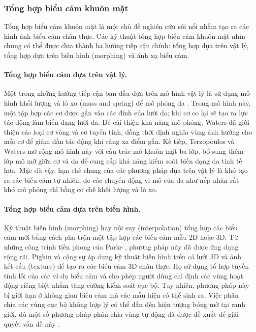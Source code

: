 \subsubsection{Tổng hợp biểu cảm khuôn mặt}

Tổng hợp biểu cảm khuôn mặt là một chủ đề nghiên cứu sôi nổi nhằm tạo ra các hình ảnh biểu cảm chân thực. Các kỹ thuật tổng hợp biểu cảm khuôn mặt nhìn chung có thể được chia thành ba hướng tiếp cận chính: tổng hợp dựa trên vật lý, tổng hợp dựa trên biến hình (morphing) và ánh xạ biểu cảm.

\paragraph{Tổng hợp biểu cảm dựa trên vật lý.}
Một trong những hướng tiếp cận ban đầu dựa trên mô hình vật lý là sử dụng mô hình khối lượng và lò xo (mass and spring) để mô phỏng da \cite{badler19813d}. Trong mô hình này, một tập hợp các cơ được gắn vào các đỉnh của lưới da; khi cơ co lại sẽ tạo ra lực tác động làm biến dạng lưới da. Để cải thiện khả năng mô phỏng, Waters \cite{waters1987muscle} đã giới thiệu các loại cơ vòng và cơ tuyến tính, đồng thời định nghĩa vùng ảnh hưởng cho mỗi cơ để giảm dần tác động khi càng xa điểm gắn. Kế tiếp, Terzopoulos và Waters \cite{terzopoulos1990physically} mở rộng mô hình này với cấu trúc mô khuôn mặt ba lớp, bổ sung thêm lớp mô mỡ giữa cơ và da để cung cấp khả năng kiểm soát biến dạng da tinh tế hơn. Mặc dù vậy, hạn chế chung của các phương pháp dựa trên vật lý là khó tạo ra các biểu cảm tự nhiên, do các chuyển động vi mô của da như nếp nhăn rất khó mô phỏng chỉ bằng cơ chế khối lượng và lò xo.

\paragraph{Tổng hợp biểu cảm dựa trên biến hình.}
Kỹ thuật biến hình (morphing) hay nội suy (interpolation) tổng hợp các biểu cảm mới bằng cách pha trộn một tập hợp các biểu cảm mẫu 2D hoặc 3D. Từ những công trình tiên phong của Parke \cite{parke1972computer}, phương pháp này đã được ứng dụng rộng rãi. Pighin và cộng sự \cite{pighin1998synthesizing} áp dụng kỹ thuật biến hình trên cả lưới 3D và ảnh kết cấu (texture) để tạo ra các biểu cảm 3D chân thực. Họ sử dụng tổ hợp tuyến tính lồi của các ví dụ biểu cảm và cho phép người dùng chỉ định các vùng hoạt động riêng biệt nhằm tăng cường kiểm soát cục bộ. Tuy nhiên, phương pháp này bị giới hạn ở không gian biểu cảm mà các mẫu hiện có thể sinh ra. Việc phân chia các vùng cục bộ không hợp lý có thể dẫn đến hiện tượng bóng mờ tại ranh giới, dù một số phương pháp phân chia vùng tự động đã được đề xuất để giải quyết vấn đề này \cite{joshi2003learning}.


